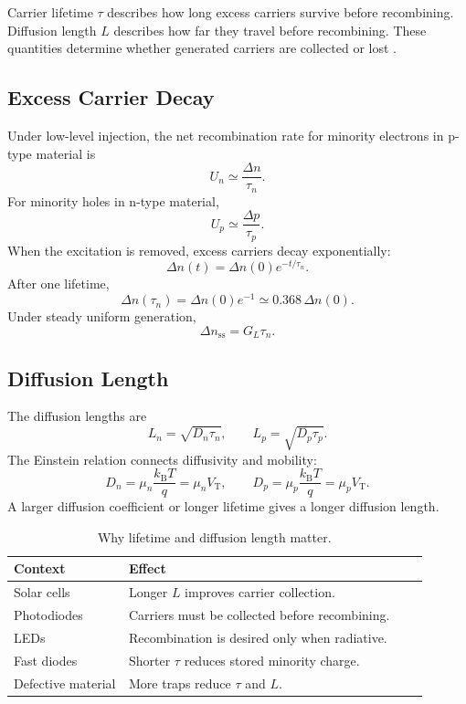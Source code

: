 \documentclass[11pt,a4paper]{article}
\newcommand{\dd}{\Delta}
\newcommand{\kb}{k_{\mathrm{B}}}
\newcommand{\VT}{V_{\mathrm{T}}}
\begin{document}
Carrier lifetime \(\tau\) describes how long excess carriers survive before recombining. Diffusion length \(L\) describes how far they travel before recombining. These quantities determine whether generated carriers are collected or lost \cite{pveducation_diffusion,mitpv_materials}.

\subsection{Excess Carrier Decay}

Under low-level injection, the net recombination rate for minority electrons in p-type material is
\begin{equation}
  U_n\simeq \frac{\dd n}{\tau_n}.
\end{equation}
For minority holes in n-type material,
\begin{equation}
  U_p\simeq \frac{\dd p}{\tau_p}.
\end{equation}
When the excitation is removed, excess carriers decay exponentially:
\begin{equation}
  \dd n(t)=\dd n(0)e^{-t/\tau_n}.
\end{equation}
After one lifetime,
\begin{equation}
  \dd n(\tau_n)=\dd n(0)e^{-1}\simeq0.368\,\dd n(0).
\end{equation}
Under steady uniform generation,
\begin{equation}
  \dd n_{\mathrm{ss}}=G_L\tau_n.
\end{equation}

\subsection{Diffusion Length}

The diffusion lengths are
\begin{equation}
  L_n=\sqrt{D_n\tau_n},\qquad L_p=\sqrt{D_p\tau_p}.
\end{equation}
The Einstein relation connects diffusivity and mobility:
\begin{equation}
  D_n=\mu_n\frac{\kb T}{q}=\mu_n\VT,\qquad
  D_p=\mu_p\frac{\kb T}{q}=\mu_p\VT .
\end{equation}
A larger diffusion coefficient or longer lifetime gives a longer diffusion length.

\begin{table}[h]
\centering
\caption{Why lifetime and diffusion length matter.}
\begin{tabular}{p{0.25\linewidth}p{0.65\linewidth}}
\toprule
Context & Effect\\
\midrule
Solar cells & Longer \(L\) improves carrier collection.\\
Photodiodes & Carriers must be collected before recombining.\\
LEDs & Recombination is desired only when radiative.\\
Fast diodes & Shorter \(\tau\) reduces stored minority charge.\\
Defective material & More traps reduce \(\tau\) and \(L\).\\
\bottomrule
\end{tabular}
\end{table}
\end{document}
